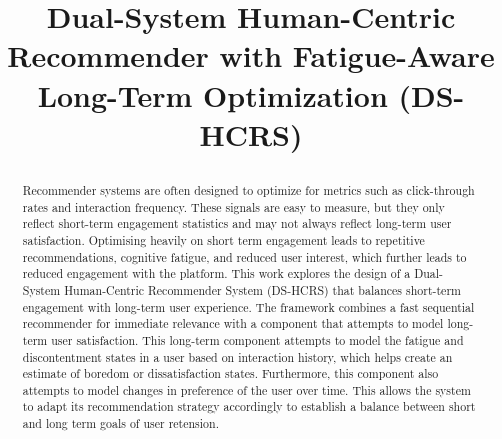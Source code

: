 \documentclass[conference]{IEEEtran}
\begin{document}
\title{Dual-System Human-Centric Recommender with Fatigue-Aware Long-Term Optimization (DS-HCRS)



}

\author{
        \and
}

\maketitle

\begin{abstract}
Recommender systems are often designed to optimize for metrics such as click-through rates and interaction frequency.
These signals are easy to measure, but they only reflect short-term engagement statistics and may not always reflect long-term user satisfaction.
Optimising heavily on short term engagement leads to repetitive recommendations, cognitive fatigue, and reduced user interest, which further leads to reduced engagement with the platform.
This work explores the design of a Dual-System Human-Centric Recommender System (DS-HCRS) that balances short-term engagement with long-term user experience.
The framework combines a fast sequential recommender for immediate relevance with a component that attempts to model long-term user satisfaction.
This long-term component attempts to model the fatigue and discontentment states in a user based on interaction history, which helps create an estimate of boredom or dissatisfaction states.
Furthermore, this component also attempts to model changes in preference of the user over time.
This allows the system to adapt its recommendation strategy accordingly to establish a balance between short and long term goals of user retension.
\end{abstract}
\end{document}
